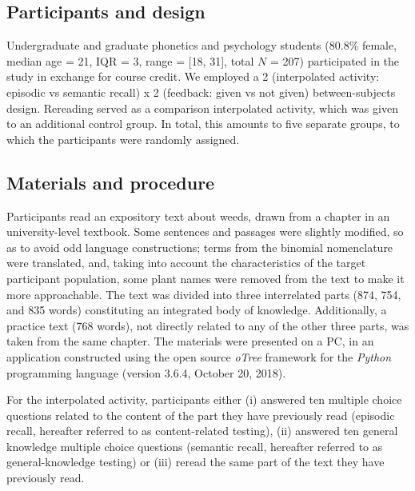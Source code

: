 \documentclass[../main.tex]{subfiles}
\begin{document}
\hypertarget{participants-and-design}{%
\subsection{Participants and design}\label{participants-and-design}}

Undergraduate and graduate phonetics and psychology students (80.8\%
female, median age = 21, IQR = 3, range = {[}18, 31{]}, total \(N\) =
207) participated in the study in exchange for course credit. We
employed a 2 (interpolated activity: episodic vs semantic recall) x 2
(feedback: given vs not given) between-subjects design. Rereading served
as a comparison interpolated activity, which was given to an additional
control group. In total, this amounts to five separate groups, to which
the participants were randomly assigned.

\hypertarget{materials-and-procedure}{%
\subsection{Materials and procedure}\label{materials-and-procedure}}

Participants read an expository text about weeds, drawn from a chapter
in an university-level textbook. Some sentences and passages were
slightly modified, so as to avoid odd language constructions; terms from
the binomial nomenclature were translated, and, taking into account the
characteristics of the target participant population, some plant names
were removed from the text to make it more approachable. The text was
divided into three interrelated parts (874, 754, and 835 words)
constituting an integrated body of knowledge. Additionally, a practice
text (768 words), not directly related to any of the other three parts,
was taken from the same chapter. The materials were presented on a PC,
in an application constructed using the open source \textit{oTree}
framework \citep[version 2.1.35,][]{chenOTreeOpensourcePlatform2016} for
the \textit{Python} programming language (version 3.6.4, October 20,
2018).

For the interpolated activity, participants either (i) answered ten
multiple choice questions related to the content of the part they have
previously read (episodic recall, hereafter referred to as
content-related testing), (ii) answered ten general knowledge multiple
choice questions (semantic recall, hereafter referred to as
general-knowledge testing) or (iii) reread the same part of the text
they have previously read.
\end{document}
